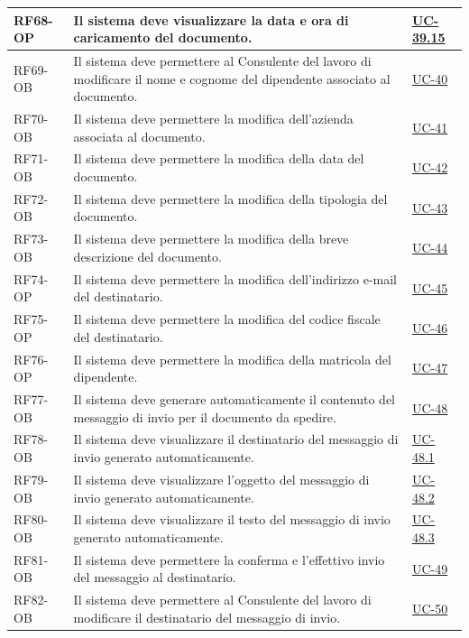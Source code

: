 ﻿\documentclass[a4paper,12pt]{article}
\begin{document}
\begin{description}[style=multiline, leftmargin=4cm, font=\bfseries]
\begin{enumerate}[leftmargin=*, nosep]
{\begin{longtable}{|p{2.5cm}|p{9.5cm}|p{3.5cm}|}
    \hline
    RF68-OP & Il sistema deve visualizzare la data e ora di caricamento del documento. & \hyperref[fig:uc-39.15]{UC-39.15} \\
    \hline
    RF69-OB & Il sistema deve permettere al Consulente del lavoro di modificare il nome e cognome del dipendente associato al documento. & \hyperref[fig:uc-40]{UC-40} \\
    \hline
    RF70-OB & Il sistema deve permettere la modifica dell'azienda associata al documento. & \hyperref[fig:uc-41]{UC-41} \\
    \hline
    RF71-OB & Il sistema deve permettere la modifica della data del documento. & \hyperref[fig:uc-42]{UC-42} \\
    \hline
    RF72-OB & Il sistema deve permettere la modifica della tipologia del documento. & \hyperref[fig:uc-43]{UC-43} \\
    \hline
    RF73-OB & Il sistema deve permettere la modifica della breve descrizione del documento. & \hyperref[fig:uc-44]{UC-44} \\
    \hline
    RF74-OP & Il sistema deve permettere la modifica dell'indirizzo e-mail del destinatario. & \hyperref[fig:uc-45]{UC-45} \\
    \hline
    RF75-OP & Il sistema deve permettere la modifica del codice fiscale del destinatario. & \hyperref[fig:uc-46]{UC-46} \\
    \hline
    RF76-OP & Il sistema deve permettere la modifica della matricola del dipendente. & \hyperref[fig:uc-47]{UC-47} \\
    \hline
    RF77-OB & Il sistema deve generare automaticamente il contenuto del messaggio di invio per il documento da spedire. & \hyperref[fig:uc-48]{UC-48} \\
    \hline
    RF78-OB & Il sistema deve visualizzare il destinatario del messaggio di invio generato automaticamente. & \hyperref[fig:uc-48.1]{UC-48.1} \\
    \hline
    RF79-OB & Il sistema deve visualizzare l'oggetto del messaggio di invio generato automaticamente. & \hyperref[fig:uc-48.2]{UC-48.2} \\
    \hline
    RF80-OB & Il sistema deve visualizzare il testo del messaggio di invio generato automaticamente. & \hyperref[fig:uc-48.3]{UC-48.3} \\
    \hline
    RF81-OB & Il sistema deve permettere la conferma e l'effettivo invio del messaggio al destinatario. & \hyperref[fig:uc-49]{UC-49} \\
    \hline
    RF82-OB & Il sistema deve permettere al Consulente del lavoro di modificare il destinatario del messaggio di invio. & \hyperref[fig:uc-50]{UC-50} \\

\end{longtable}}
\end{enumerate}
\end{description}
\end{document}
